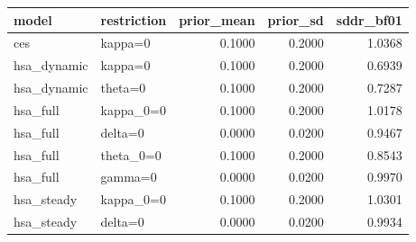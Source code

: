 \begin{tabular}{llrrr}
\toprule
model & restriction & prior\_mean & prior\_sd & sddr\_bf01 \\
\midrule
ces & kappa=0 & 0.1000 & 0.2000 & 1.0368 \\
hsa\_dynamic & kappa=0 & 0.1000 & 0.2000 & 0.6939 \\
hsa\_dynamic & theta=0 & 0.1000 & 0.2000 & 0.7287 \\
hsa\_full & kappa\_0=0 & 0.1000 & 0.2000 & 1.0178 \\
hsa\_full & delta=0 & 0.0000 & 0.0200 & 0.9467 \\
hsa\_full & theta\_0=0 & 0.1000 & 0.2000 & 0.8543 \\
hsa\_full & gamma=0 & 0.0000 & 0.0200 & 0.9970 \\
hsa\_steady & kappa\_0=0 & 0.1000 & 0.2000 & 1.0301 \\
hsa\_steady & delta=0 & 0.0000 & 0.0200 & 0.9934 \\
\bottomrule
\end{tabular}
